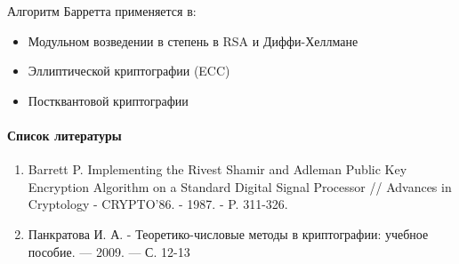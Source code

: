 \documentclass[12pt,a4paper]{article}
\begin{document}
Алгоритм Барретта применяется в:

\begin{itemize}
\item Модульном возведении в степень в RSA и Диффи-Хеллмане
\item Эллиптической криптографии (ECC)
\item Постквантовой криптографии 
\end{itemize}

\newpage
\begin{center}
\paragraph{Список литературы}
\end{center}

\begin{enumerate}
\item Barrett P. Implementing the Rivest Shamir and Adleman Public Key Encryption Algorithm on a Standard Digital Signal Processor // Advances in Cryptology - CRYPTO'86. - 1987. - P. 311-326.
\item Панкратова И. А. - Теоретико-числовые методы в криптографии: учебное пособие. — 2009. — С. 12-13
\end{enumerate}
\end{document}
